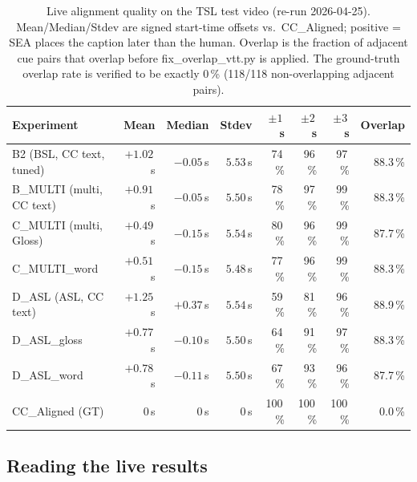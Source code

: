 \documentclass[11pt,a4paper]{article}
\def\texttt#1{#1}%
\def\textbf#1{#1}%
\def\textit#1{#1}%
\def\emph#1{#1}%
\begin{document}
\begin{table}[h]
\centering
\small
\renewcommand{\arraystretch}{1.1}
\begin{tabular}{lrrrrrrr}
\toprule
\textbf{Experiment} & \textbf{Mean} & \textbf{Median} & \textbf{Stdev} &
\textbf{$\pm 1$\,s} & \textbf{$\pm 2$\,s} & \textbf{$\pm 3$\,s} & \textbf{Overlap} \\
\midrule
B2   (BSL, CC text, tuned)              & $+1.02$\,s  & $-0.05$\,s & $5.53$\,s & 74\,\% & 96\,\% & 97\,\% & 88.3\,\% \\
B\_MULTI (multi, CC text)               & $+0.91$\,s  & $-0.05$\,s & $5.50$\,s & 78\,\% & \textbf{97\,\%} & \textbf{99\,\%} & 88.3\,\% \\
\textbf{C\_MULTI} (multi, Gloss)        & \textbf{$+0.49$\,s} & \textbf{$-0.15$\,s} & $5.54$\,s & \textbf{80\,\%} & 96\,\% & \textbf{99\,\%} & \textbf{87.7\,\%} \\
C\_MULTI\_word                          & $+0.51$\,s  & $-0.15$\,s & $5.48$\,s & 77\,\% & 96\,\% & 99\,\% & 88.3\,\% \\
D\_ASL  (ASL, CC text)                  & $+1.25$\,s  & $+0.37$\,s & $5.54$\,s & 59\,\% & 81\,\% & 96\,\% & 88.9\,\% \\
D\_ASL\_gloss                           & $+0.77$\,s  & $-0.10$\,s & $5.50$\,s & 64\,\% & 91\,\% & 97\,\% & 88.3\,\% \\
D\_ASL\_word                            & $+0.78$\,s  & $-0.11$\,s & $5.50$\,s & 67\,\% & 93\,\% & 96\,\% & 87.7\,\% \\
\midrule
\textit{CC\_Aligned} (GT)
                                        & $0$\,s & $0$\,s & $0$\,s
                                        & 100\,\% & 100\,\% & 100\,\% & \textbf{0.0\,\%} \\
\bottomrule
\end{tabular}
\caption{\textbf{Live alignment quality on the TSL test video} (re-run
2026-04-25). \texttt{Mean/Median/Stdev} are signed start-time offsets vs.\
\texttt{CC\_Aligned}; positive = SEA places the caption later than the
human. \texttt{Overlap} is the fraction of adjacent cue pairs that overlap
\emph{before} \texttt{fix\_overlap\_vtt.py} is applied. The ground-truth
overlap rate is verified to be exactly 0\,\% (118/118 non-overlapping
adjacent pairs).}
\label{tab:results-tsl}
\end{table}

\subsection{Reading the live results}
\end{document}
